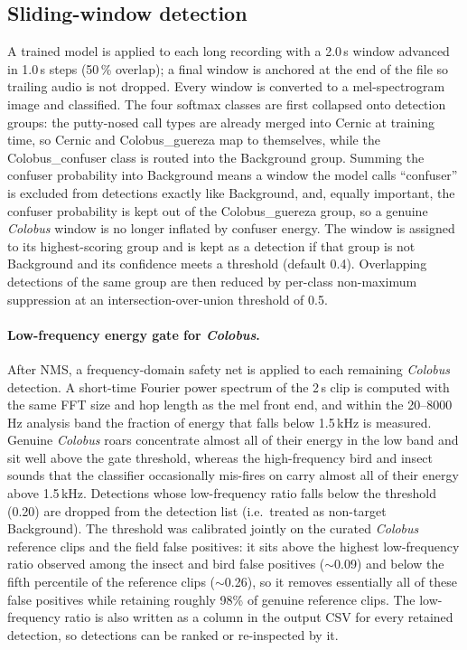 \documentclass[final,3p,times]{elsarticle}
\begin{document}
\subsection*{Sliding-window detection}

A trained model is applied to each long recording with a 2.0\,s window
advanced in 1.0\,s steps (50\,\% overlap); a final window is anchored at the
end of the file so trailing audio is not dropped. Every window is converted to
a mel-spectrogram image and classified. The four softmax classes are first
collapsed onto detection groups: the
putty-nosed call types are already merged into Cernic at training time, so
Cernic and Colobus\_guereza map to themselves, while the Colobus\_confuser
class is routed into the Background group. Summing the confuser probability
into Background means a window the model calls ``confuser'' is excluded from
detections exactly like Background, and, equally important, the confuser
probability is kept out of the Colobus\_guereza group, so a genuine
\textit{Colobus} window is no longer inflated by confuser energy. The window is
assigned to its highest-scoring group and is kept as a detection if that group
is not Background and its confidence meets a threshold (default 0.4).
Overlapping detections of the same group are then reduced by per-class
non-maximum suppression at an intersection-over-union threshold of 0.5.

\paragraph{Low-frequency energy gate for \textit{Colobus}.}
After NMS, a frequency-domain safety net is applied to each remaining
\textit{Colobus} detection. A short-time Fourier power spectrum of the 2\,s
clip is computed with the same FFT size and hop length as the mel front end,
and within the 20--8000\,Hz analysis band the fraction of energy that falls
below 1.5\,kHz is measured. Genuine \textit{Colobus} roars concentrate almost
all of their energy in the low band and sit well above the gate threshold,
whereas the high-frequency bird and insect sounds that the classifier
occasionally mis-fires on carry almost all of their energy above 1.5\,kHz.
Detections whose low-frequency ratio falls below the threshold (0.20) are
dropped from the detection list (i.e.\ treated as non-target Background). The
threshold was calibrated jointly on the curated \textit{Colobus} reference
clips and the field false positives: it sits above the highest low-frequency
ratio observed among the insect and bird false positives ($\sim$0.09) and below
the fifth percentile of the reference clips ($\sim$0.26), so it removes
essentially all of these false positives while retaining roughly 98\% of
genuine reference clips. The low-frequency ratio is also written as a column
in the output CSV for every retained detection, so detections can be ranked or
re-inspected by it.
\end{document}
